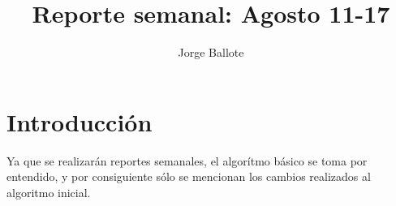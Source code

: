 \documentclass[11pt]{article}
\title{Reporte semanal: Agosto 11-17}
\author{Jorge Ballote}
\begin{document}
% 
\maketitle
\section{Introducción} Ya que se realizarán reportes semanales, el algorítmo básico se toma por entendido, y por consiguiente sólo se mencionan los cambios realizados al algoritmo inicial.
\end{document}
